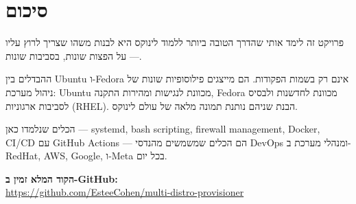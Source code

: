 \documentclass[12pt,a4paper]{article}
\begin{document}
\section{סיכום}

פרויקט זה לימד אותי שהדרך הטובה ביותר ללמוד לינוקס היא לבנות משהו שצריך לרוץ עליו — על הפצות שונות, בסביבות שונות.

ההבדלים בין Ubuntu ו-Fedora אינם רק בשמות הפקודות. הם מייצגים פילוסופיות שונות של ניהול מערכת: Ubuntu מכוונת לנגישות ומהירות התקנה, Fedora מכוונת לחדשנות ולבסיס לסביבות ארגוניות (RHEL). הבנת שניהם נותנת תמונה מלאה של עולם לינוקס.

הכלים שנלמדו כאן — systemd, bash scripting, firewall management, Docker, CI/CD עם GitHub Actions — הם הכלים שמשמשים מהנדסי DevOps ומנהלי מערכת ב-RedHat, AWS, Google, ו-Meta בכל יום.

\vspace{1cm}
\begin{infobox}
\centering
\textbf{הקוד המלא זמין ב-GitHub:}\\
\url{https://github.com/EsteeCohen/multi-distro-provisioner}
\end{infobox}
\end{document}
